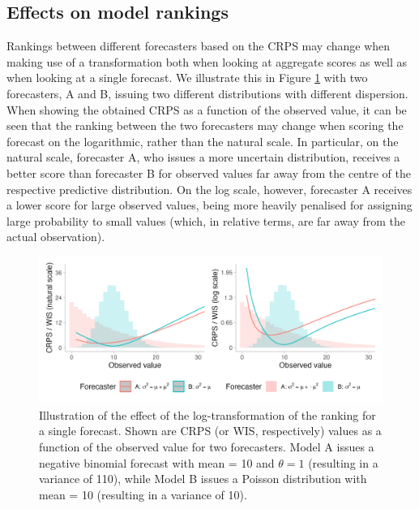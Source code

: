 \documentclass{article}
\begin{document}
\subsection{Effects on model rankings}
\label{sec:methods:rankings}
Rankings between different forecasters based on the CRPS may change when making use of a transformation both when looking at aggregate scores as well as when looking at a single forecast. We illustrate this in Figure \ref{fig:illustration-ranking} with two forecasters, A and B, issuing two different distributions with different dispersion. When showing the obtained CRPS as a function of the observed value, it can be seen that the ranking between the two forecasters may change when scoring the forecast on the logarithmic, rather than the natural scale. In particular, on the natural scale, forecaster A, who issues a more uncertain distribution, receives a better score than forecaster B for observed values far away from the centre of the respective predictive distribution. On the log scale, however, forecaster A receives a lower score for large observed values, being more heavily penalised for assigning large probability to small values (which, in relative terms, are far away from the actual observation). 


\begin{figure}[h!]
\centering
\includegraphics[width = 1\textwidth]{output/figures/illustration-effect-log-ranking-crps.png}
\caption{Illustration of the effect of the log-transformation of the ranking for a single forecast. Shown are CRPS (or WIS, respectively) values as a function of the observed value for two forecasters. Model A issues a negative binomial forecast with mean = 10 and $\theta = 1$ (resulting in a variance of 110), while Model B issues a Poisson distribution with mean = 10 (resulting in a variance of 10).}
\label{fig:illustration-ranking}
\end{figure}
\end{document}
